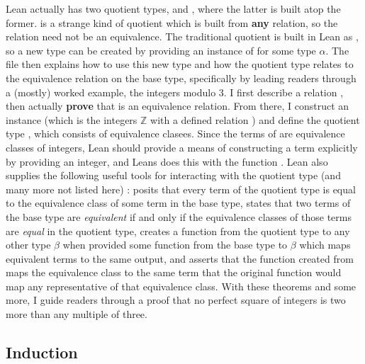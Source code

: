 Lean actually has two quotient types,  and , where the
latter is built atop the former.  is a strange kind of quotient which
is built from \textbf{any} relation, so the relation need not be an equivalence.
The traditional quotient is built in Lean as 
, so a new  type can 
be created by providing an instance of  for some type 
$\alpha$. The file then explains how to use this new type and how the quotient
type relates to the equivalence relation on the base type, specifically by
leading readers through a (mostly) worked example, the integers modulo 3.
I first describe a relation 
, then
actually \textbf{prove} that  is an equivalence relation. From there,
I construct an instance  (which is the integers
$\mathbb{Z}$ with a defined relation ) and define the quotient
type , which consists of equivalence clasees. 
Since the terms of  are equivalence classes of integers, 
Lean should provide a means of constructing a term explicitly by providing 
an integer, and Leans does this with the function
. 
Lean also supplies the following useful tools for interacting with the 
quotient type (and many more not listed here) :
 posits that every term of the quotient type is
equal to the equivalence class of some term in the base type, 
 states that two terms of the base type are \textit{equivalent} if
and only if the equivalence classes of those terms are \textit{equal} in the quotient type,
 creates a function from the quotient type to any other type 
$\beta$ when provided some function from the base type to $\beta$ which
maps equivalent terms to the same output, and 
 asserts that the function created from 
maps the equivalence class to the same term that the original function would
map any representative of that equivalence class. With these theorems and some more, 
I guide readers through a proof that no perfect square of integers is two more than
any multiple of three.

\subsection{Induction}

